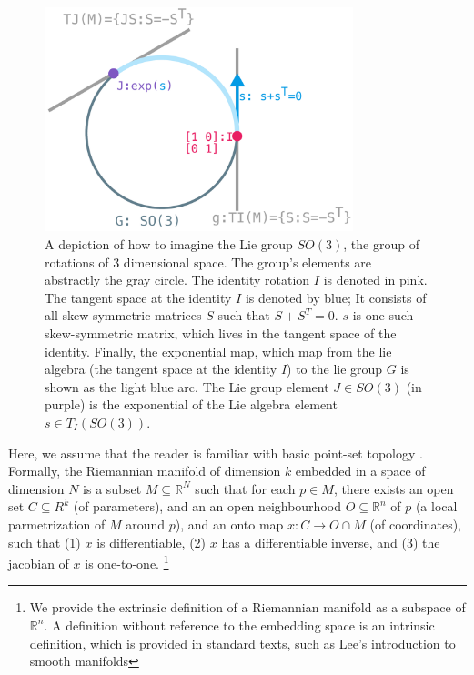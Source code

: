 \documentclass[11pt]{book}
\newcommand{\R}{\ensuremath{\mathbb R}}
\begin{document}
\begin{figure}[htb]
\includegraphics[width=0.8\textwidth]{./lie-group.pdf}
\caption{A depiction of how to imagine the Lie group $SO(3)$, the group of rotations of 3 dimensional space. The group's
elements are abstractly the gray circle. The identity rotation $I$ is denoted in pink. The tangent space at the identity $I$ is
denoted by blue; It consists of all skew symmetric matrices $S$ such that $S + S^T = 0$.  $s$ is one such skew-symmetric matrix,
which lives in the tangent space of the identity. Finally, the exponential map, which map from the lie algebra (the tangent space at the identity $I$)
to the lie group $G$ is shown as the light blue arc. The Lie group element $J \in SO(3) $ (in purple) is the exponential of the 
Lie algebra element $s \in T_I(SO(3))$.}
\end{figure}



Here, we assume that the reader is familiar with basic point-set topology \cite{munkres2014topology}.
Formally, the Riemannian manifold of dimension $k$ embedded in a space of dimension $N$
is a subset $M \subseteq \R^N$ such that for each $p \in M$,
there exists an open set $C \subseteq R^k$ (of parameters), and an
an open neighbourhood $O \subseteq \mathbb R^n$ of $p$ (a local parmetrization of $M$ around $p$),
and an onto map $x: C \rightarrow O \cap M$ (of coordinates), such that (1) $x$ is differentiable,
(2) $x$ has a differentiable inverse, and (3) the jacobian of $x$ is one-to-one.
\footnote{We provide the extrinsic definition of a Riemannian manifold as a
subspace of $\mathbb R^n$.  A definition without reference to the embedding
space is an intrinsic definition, which is provided in standard texts, such as
Lee's introduction to smooth manifolds}
\end{document}
